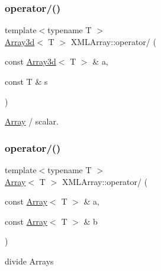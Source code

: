 \mbox{\label{namespaceXMLArray_af90bb7d526be91f27f5ae1bdf5bd5a44}} 
\subsubsection{\texorpdfstring{operator/()}{operator/()}\hspace{0.1cm}{\footnotesize\ttfamily [1/4]}}
{\footnotesize\ttfamily template$<$typename T $>$ \\
\mbox{\hyperlink{classXMLArray_1_1Array3d}{Array3d}}$<$ T $>$ X\+M\+L\+Array\+::operator/ (\begin{DoxyParamCaption}\item[{const \mbox{\hyperlink{classXMLArray_1_1Array3d}{Array3d}}$<$ T $>$ \&}]{a,  }\item[{const T \&}]{s }\end{DoxyParamCaption})\hspace{0.3cm}{\ttfamily [inline]}}



\mbox{\hyperlink{classXMLArray_1_1Array}{Array}} / scalar. 

\mbox{\label{namespaceXMLArray_a3f57a2620a7685e7c85e5a363ee053d1}} 
\subsubsection{\texorpdfstring{operator/()}{operator/()}\hspace{0.1cm}{\footnotesize\ttfamily [2/4]}}
{\footnotesize\ttfamily template$<$typename T $>$ \\
\mbox{\hyperlink{classXMLArray_1_1Array}{Array}}$<$ T $>$ X\+M\+L\+Array\+::operator/ (\begin{DoxyParamCaption}\item[{const \mbox{\hyperlink{classXMLArray_1_1Array}{Array}}$<$ T $>$ \&}]{a,  }\item[{const \mbox{\hyperlink{classXMLArray_1_1Array}{Array}}$<$ T $>$ \&}]{b }\end{DoxyParamCaption})\hspace{0.3cm}{\ttfamily [inline]}}



divide Arrays 

\mbox{\label{namespaceXMLArray_a664f129a59f9d36a6e46ee4af2de6116}} 
